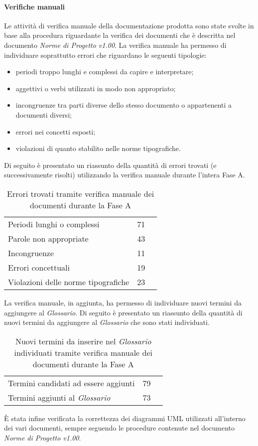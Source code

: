 \documentclass[../PianoDiQualifica.tex]{subfiles}
\begin{document}
\begin{appendices}
			\paragraph{Verifiche manuali}
			Le attività di verifica manuale della documentazione prodotta sono state svolte in base alla procedura riguardante la verifica dei documenti che è descritta nel documento \textit{Norme di Progetto v1.00}. La verifica manuale ha permesso di individuare soprattutto errori che riguardano le seguenti tipologie:
			\begin{itemize}
				\item periodi troppo lunghi e complessi da capire e interpretare;
				\item aggettivi o verbi utilizzati in modo non appropriato;
				\item incongruenze tra parti diverse dello stesso documento o appartenenti a documenti diversi;
				\item errori nei concetti esposti;
				\item violazioni di quanto stabilito nelle norme tipografiche.
			\end{itemize}
			Di seguito è presentato un riassunto della quantità di errori trovati (e successivamente risolti) utilizzando la verifica manuale durante l'intera Fase A.
\begin{table}[H]
		\centering
		\begin{tabular}{l * {2}{c}}
			\midrule
			Periodi lunghi o complessi &	71 \\
			Parole non appropriate & 43 \\
			Incongruenze & 11 \\
			Errori concettuali & 19 \\
			Violazioni delle norme tipografiche & 23 \\
			\midrule
		\end{tabular}
		\caption{Errori trovati tramite verifica manuale dei documenti durante la Fase A}
		\label{tab:errori_manuale}
\end{table}
			La verifica manuale, in aggiunta, ha permesso di individuare nuovi termini da aggiungere al \textit{Glossario}. Di seguito è presentato un riassunto della quantità di nuovi termini da aggiungere al \textit{Glossario} che sono stati individuati.
\begin{table}[H]
		\centering
		\begin{tabular}{l * {2}{c}}
			\midrule
			Termini candidati ad essere aggiunti &	79 \\
			Termini aggiunti al \textit{Glossario} & 73 \\
			\midrule
		\end{tabular}
		\caption{Nuovi termini da inserire nel \textit{Glossario} individuati tramite verifica manuale dei documenti durante la Fase A}
		\label{tab:termini_glossario}
\end{table}	
			È stata infine verificata la correttezza dei diagrammi UML utilizzati all'interno dei vari documenti, sempre seguendo le procedure contenute nel documento \textit{Norme di Progetto v1.00}.

\end{appendices}
\end{document}
